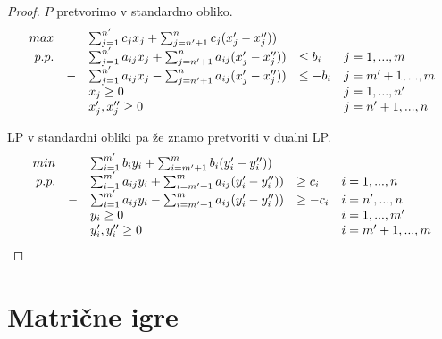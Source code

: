\documentclass[11pt, a4paper]{article}
\begin{document}
    \begin{proof}
        \(P\) pretvorimo v standardno obliko.
        \[
            \begin{array}{r r l l l}
                max & & \sum_{j=1}^{n^\prime} c_j x_j + \sum_{j=n^\prime + 1}^{n} c_j (x_j^\prime - x_j^{\prime \prime})) \\
                
                p.p. & & \sum_{j=1}^{n^\prime} a_{ij} x_j + \sum_{j=n^\prime + 1}^{n} a_{ij} (x_j^\prime - x_j^{\prime \prime})) & \le b_i & j=1,...,m \\

                & - & \sum_{j=1}^{n^\prime} a_{ij} x_j - \sum_{j=n^\prime + 1}^{n} a_{ij} (x_j^\prime - x_j^{\prime \prime})) & \le - b_i & j=m^\prime + 1,...,m \\

                & & x_j \ge 0 & & j=1,...,n^\prime \\
                & & x_j^\prime,x_j^{\prime\prime} \ge 0 & & j=n^\prime + 1,...,n \\
            \end{array}    
        \]

        LP v standardni obliki pa že znamo pretvoriti v dualni LP.
        \[
            \begin{array}{r r l l l}
                min & & \sum_{i=1}^{m^\prime} b_i y_i + \sum_{i=m^\prime + 1}^{m} b_i (y_i^\prime - y_i^{\prime \prime})) \\

                p.p. & & \sum_{i=1}^{m^\prime} a_{ij} y_i + \sum_{i=m^\prime + 1}^{m} a_{ij} (y_i^\prime - y_i^{\prime \prime})) & \ge c_i & i=1,...,n \\

                & - & \sum_{i=1}^{m^\prime} a_{ij} y_i - \sum_{i=m^\prime + 1}^{m} a_{ij} (y_i^\prime - y_i^{\prime \prime})) & \ge - c_i & i=n^\prime,...,n \\

                & & y_i \ge 0 & & i=1,...,m^\prime \\
                & & y_i^\prime, y_i^{\prime \prime} \ge 0 & & i=m^\prime + 1,...,m \\
             \end{array}
        \]
    \end{proof}


    \pagebreak
    \section{Matrične igre}
\end{document}
